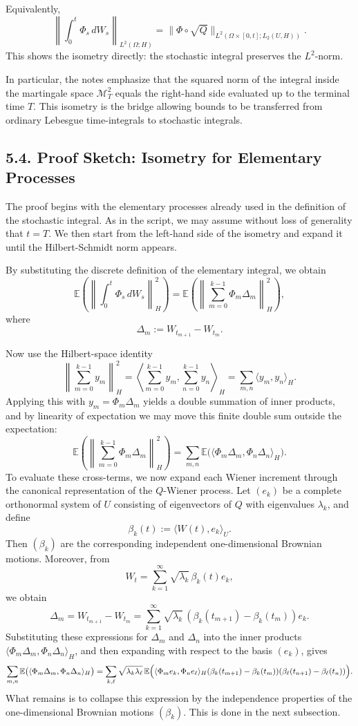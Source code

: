 \documentclass[11pt]{article}
\theoremstyle{definition}
\theoremstyle{remark}
\begin{document}
Equivalently,
\[
\left\|\int_0^t \Phi_s\,dW_s\right\|_{L^2(\Omega;H)}
=
\|\Phi\circ \sqrt Q\|_{L^2(\Omega\times[0,t];L_2(U,H))}.
\]
This shows the isometry directly: the stochastic integral preserves the \(L^2\)-norm.

In particular, the notes emphasize that the squared norm of the integral inside the martingale space \(\mathcal M_T^2\) equals the right-hand side evaluated up to the terminal time \(T\). This isometry is the bridge allowing bounds to be transferred from ordinary Lebesgue time-integrals to stochastic integrals.

\subsection*{5.4. Proof Sketch: Isometry for Elementary Processes}
The proof begins with the elementary processes already used in the definition of the stochastic integral. As in the script, we may assume without loss of generality that \(t=T\). We then start from the left-hand side of the isometry and expand it until the Hilbert-Schmidt norm appears.

By substituting the discrete definition of the elementary integral, we obtain
\[
\mathbb E\left(\left\|\int_0^t \Phi_s\,dW_s\right\|_H^2\right)
=
\mathbb E\left(\left\|\sum_{m=0}^{k-1}\Phi_m\Delta_m\right\|_H^2\right),
\]
where
\[
\Delta_m:=W_{t_{m+1}}-W_{t_m}.
\]

Now use the Hilbert-space identity
\[
\left\|\sum_{m=0}^{k-1} y_m\right\|_H^2
=
\left\langle \sum_{m=0}^{k-1} y_m,\sum_{n=0}^{k-1} y_n\right\rangle_H
=
\sum_{m,n}\langle y_m,y_n\rangle_H.
\]
Applying this with \(y_m=\Phi_m\Delta_m\) yields a double summation of inner products, and by linearity of expectation we may move this finite double sum outside the expectation:
\[
\mathbb E\left(\left\|\sum_{m=0}^{k-1}\Phi_m\Delta_m\right\|_H^2\right)
=
\sum_{m,n}\mathbb E\bigl(\langle \Phi_m\Delta_m,\Phi_n\Delta_n\rangle_H\bigr).
\]
To evaluate these cross-terms, we now expand each Wiener increment through the canonical representation of the \(Q\)-Wiener process. Let \((e_k)\) be a complete orthonormal system of \(U\) consisting of eigenvectors of \(Q\) with eigenvalues \(\lambda_k\), and define
\[
\beta_k(t):=\langle W(t),e_k\rangle_U.
\]
Then \((\beta_k)\) are the corresponding independent one-dimensional Brownian motions. Moreover, from
\[
W_t=\sum_{k=1}^{\infty}\sqrt{\lambda_k}\,\beta_k(t)e_k,
\]
we obtain
\[
\Delta_m
=
W_{t_{m+1}}-W_{t_m}
=
\sum_{k=1}^{\infty}\sqrt{\lambda_k}\,(\beta_k(t_{m+1})-\beta_k(t_m))e_k.
\]
Substituting these expressions for \(\Delta_m\) and \(\Delta_n\) into the inner products \(\langle \Phi_m\Delta_m,\Phi_n\Delta_n\rangle_H\), and then expanding with respect to the basis \((e_k)\), gives
\[
\sum_{m,n}\mathbb E\bigl(\langle \Phi_m\Delta_m,\Phi_n\Delta_n\rangle_H\bigr)
=
\sum_{k,\ell}\sqrt{\lambda_k\lambda_\ell}\,
\mathbb E\Bigl(\langle \Phi_m e_k,\Phi_n e_\ell\rangle_H
(\beta_k(t_{m+1})-\beta_k(t_m))(\beta_\ell(t_{n+1})-\beta_\ell(t_n))\Bigr).
\]
What remains is to collapse this expression by the independence properties of the one-dimensional Brownian motions \((\beta_k)\). This is done in the next subsection.
\end{document}
